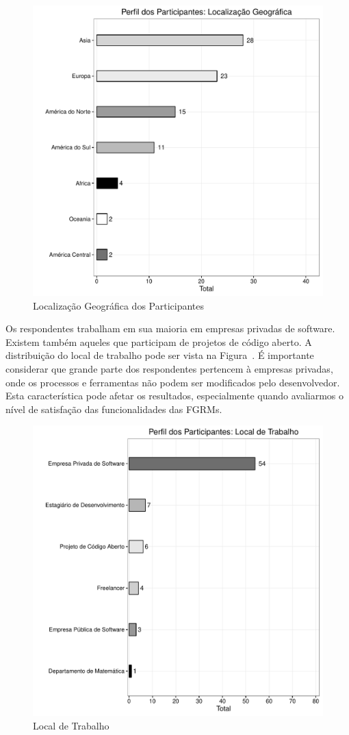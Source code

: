 \begin{figure}[htpb]
	\centering
	\includegraphics[width=0.8\linewidth]{./chapter-pesquisa-com-profissionais/img/grafico_melhorias_fgrm_localizacao_geografica.pdf}
	\caption{Localização Geográfica dos Participantes}
\label{fig:grafico_melhorias_fgrm_localizacao_geografica}
\end{figure}

Os respondentes trabalham em sua maioria em empresas privadas de software.
Existem também aqueles que participam de projetos de código aberto. A
distribuição do local de trabalho pode ser vista na
Figura~\cite{fig:grafico_melhorias_fgrm_local_trabalho}. É importante considerar
que grande parte dos respondentes pertencem à empresas privadas, onde os
processos e ferramentas não podem ser modificados pelo desenvolvedor. Esta
característica pode afetar os resultados, especialmente quando avaliarmos o
nível de satisfação das funcionalidades das FGRMs.

\begin{figure}[htpb]
	\centering
	\includegraphics[width=0.8\linewidth]{./chapter-pesquisa-com-profissionais/img/grafico_melhorias_fgrm_local_trabalho.pdf}
	\caption{Local de Trabalho}
\label{fig:grafico_melhorias_fgrm_local_trabalho}
\end{figure}

